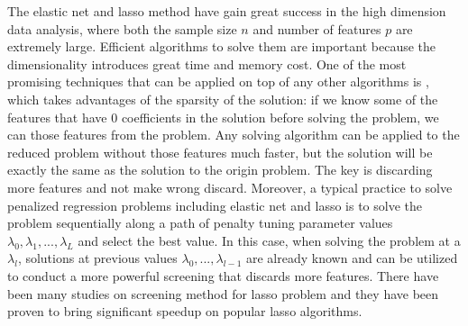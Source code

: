 The elastic net and lasso method have gain great success in the high dimension data analysis, where both the sample size $n$ and number of features $p$ are extremely large. Efficient algorithms to solve them are important because the dimensionality introduces great time and memory cost. One of the most promising techniques that can be applied on top of any other algorithms is , which takes advantages of the sparsity of the solution: if we know some of the features that have 0 coefficients in the solution before solving the problem, we can  those features from the problem. Any solving algorithm can be applied to the reduced problem without those features much faster, but the solution will be exactly the same as the solution to the origin problem. The key is discarding more features and not make wrong discard. Moreover, a typical practice to solve penalized regression problems including elastic net and lasso is to solve the problem sequentially along a path of penalty tuning parameter values $\lambda_0,\lambda_1,...,\lambda_L$ and select the best value. In this case, when solving the problem at a $\lambda_l$, solutions at previous values $\lambda_0,...,\lambda_{l-1}$ are already known and can be utilized to conduct a more powerful screening that discards more features. There have been many studies on screening method for lasso problem \citep{ghaoui2010safe,Tibshirani2012,wang2013lasso,Zeng2021,wang2021adaptive} and they have been proven to bring significant speedup on popular lasso algorithms.

